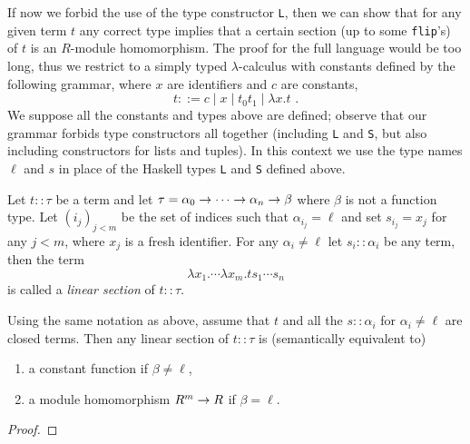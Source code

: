 If now we forbid the use of the type constructor \lstinline{L}, then
we can show that for any given term $t$ any correct type implies that
a certain section (up to some \lstinline{flip}'s) of $t$ is an
$R$-module homomorphism. The proof for the full language would be too
long, thus we restrict to a simply typed $\lambda$-calculus with
constants defined by the following grammar, where $x$ are identifiers
and $c$ are constants,
\begin{equation}
  \label{eq:lambda}
  t ::= c \;|\; x \;|\; t_0 t_1 \;|\; \lambda x . t  \text{ .}
\end{equation}
We suppose all the constants and types above are defined; observe that
our grammar forbids type constructors all together (including
\lstinline{L} and \lstinline{S}, but also including constructors for
lists and tuples). In this context we use the type names $\ell$ and
$s$ in place of the Haskell types \lstinline{L} and \lstinline{S}
defined above.

\begin{definition}
  Let $t::\tau$ be a term and let
  $\tau=\alpha_0\rightarrow\cdots\rightarrow\alpha_n\rightarrow\beta$ where $\beta$ is not a
  function type. Let $(i_j)_{j<m}$ be the set of indices such that
  $\alpha_{i_j}=\ell$ and set $s_{i_j}=x_j$ for any $j<m$, where $x_j$
  is a fresh identifier.  For any $\alpha_i\ne\ell$ let
  $s_i::\alpha_i$ be any term, then the term
  \begin{equation}
    \lambda x_1.\cdots\lambda x_m.ts_1\cdots s_n
  \end{equation}
  is called a \emph{linear section} of $t::\tau$.
\end{definition}

\begin{proposition}
  \label{th:lininference}
  Using the same notation as above, assume that $t$ and all the
  $s::\alpha_i$ for $\alpha_i\ne\ell$ are closed terms. Then any
  linear section of $t::\tau$ is (semantically equivalent to)
  \begin{enumerate}
  \item a constant function if $\beta\ne\ell$,
  \item a module homomorphism $R^m\rightarrow R$ if $\beta=\ell$.
  \end{enumerate}
\end{proposition}
\begin{proof}
  \todo
\end{proof}

